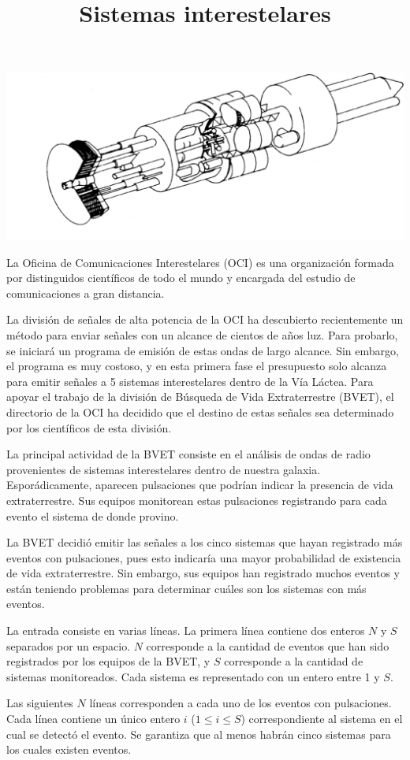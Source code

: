 \documentclass{oci}
\title{Sistemas interestelares}
\begin{document}
\begin{problemDescription}
\begin{center}
\includegraphics[scale=0.3]{interestellar.png}
\end{center}
La Oficina de Comunicaciones Interestelares (OCI) es una organización formada por distinguidos científicos de todo el mundo y encargada del estudio de comunicaciones a gran distancia.

La división de señales de alta potencia de la OCI ha descubierto recientemente un método para enviar señales con un alcance de cientos de años luz.
Para probarlo, se iniciará un programa de emisión de estas ondas de largo alcance.
Sin embargo, el programa es muy costoso, y en esta primera fase el presupuesto solo alcanza para emitir señales a 5 sistemas interestelares dentro de la Vía Láctea.
Para apoyar el trabajo de la división de Búsqueda de Vida Extraterrestre (BVET), el directorio de la OCI ha decidido que el destino de estas señales sea determinado por los científicos de esta división.

La principal actividad de la BVET consiste en el análisis de ondas de radio provenientes de sistemas interestelares dentro de nuestra galaxia.
Esporádicamente, aparecen pulsaciones que podrían indicar la presencia de vida extraterrestre.
Sus equipos monitorean estas pulsaciones registrando para cada evento el sistema de donde provino.

La BVET decidió emitir las señales a los cinco sistemas que hayan registrado más eventos con pulsaciones, pues esto indicaría una mayor probabilidad de existencia de vida extraterrestre.
Sin embargo, sus equipos han registrado muchos eventos y están teniendo problemas para determinar cu\'ales son los sistemas con más eventos.

\end{problemDescription}

\begin{inputDescription}
La entrada consiste en varias líneas.
La primera línea contiene dos enteros $N$ y $S$ separados por un espacio.
$N$ corresponde a la cantidad de eventos que han sido registrados por los equipos de la BVET, y
$S$ corresponde a la cantidad de sistemas monitoreados.
Cada sistema es representado con un entero entre 1 y $S$.

Las siguientes $N$ líneas corresponden a cada uno de los eventos con pulsaciones.
Cada línea contiene un único entero $i$ ($1 \le i \le S$) correspondiente al sistema en el cual se detectó el evento.
Se garantiza que al menos habrán cinco sistemas para los cuales existen eventos.
\end{inputDescription}
\end{document}
